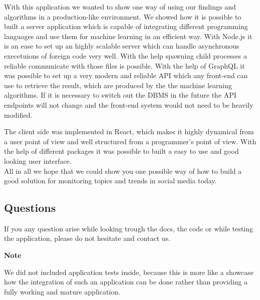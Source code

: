 \documentclass[]{article}
\begin{document}
With this application we wanted to show one way of using our findings
and algorithms in a production-like environment. We showed how it is
possible to built a server application which is capable of integrating
different programming languages and use them for machine learning in an
efficient way. With Node.js it is an ease to set up an highly scalable
server which can handle asynchronous execetuions of foreign code very
well. With the help spawning child processes a reliable communicate with
those files is possible. With the help of GraphQL it was possible to set
up a very modern and reliable API which any front-end can use to
retrieve the result, which are produced by the the machine learning
algorithms. If it is necessary to switch out the DBMS in the future the
API endpoints will not change and the front-end system would not need to
be heavily modified.

The client side was implemented in React, which makes it highly
dynamical from a user point of view and well structured from a
programmer's point of view. With the help of different packages it was
possible to built a easy to use and good looking user interface.\\
All in all we hope that we could show you one possible way of how to
build a good solution for monitoring topics and trends in social media
today.

\subsection{Questions}\label{questions}

If you any question arise while looking trough the docs, the code or
while testing the application, please do not hesitate and contact us.

\textbf{Note}

We did not included application tests inside, because this is more like
a showcase how the integration of such an application can be done rather
than providing a fully working and mature application.
\end{document}
